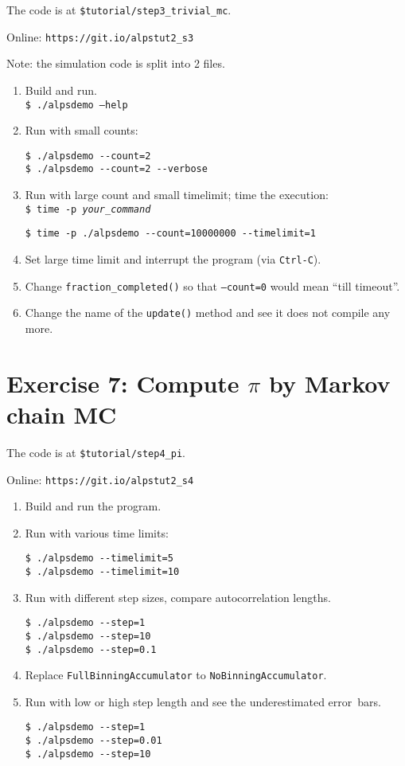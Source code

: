 \documentclass[12pt]{article}
\newcommand{\code}[1]{\texttt{#1}}
\begin{document}
The code is at \texttt{\color{ballblue}\$tutorial/step3\_trivial\_mc}.

Online: \nolinkurl{https://git.io/alpstut2_s3}

Note: the simulation code is split into 2 files.

\begin{enumerate}
\item Build and run.\\
\code{\$ ./alpsdemo --help}
\item Run with small counts:
\begin{lstlisting}[]
$ ./alpsdemo --count=2
$ ./alpsdemo --count=2 --verbose
\end{lstlisting}
\item Run with large count and small timelimit; time the execution:\\
\code{\$ time -p \emph{your\_command}}
\begin{lstlisting}[emph={time}]
$ time -p ./alpsdemo --count=10000000 --timelimit=1
\end{lstlisting}%
\item Set large time limit and interrupt the program (via \code{Ctrl-C}).
\item Change \code{fraction\_completed()} so that \code{--count=0} would mean ``till timeout''.
\item Change the name of the \code{update()} method and see it does not compile any more.
\end{enumerate}

\section{Exercise 7: Compute $\pi$ by Markov chain MC}

The code is at \texttt{\color{ballblue}\$tutorial/step4\_pi}.

Online: \nolinkurl{https://git.io/alpstut2_s4}

\begin{enumerate}
\item Build and run the program.
\item Run with various time limits:
  \begin{lstlisting}
$ ./alpsdemo --timelimit=5
$ ./alpsdemo --timelimit=10
  \end{lstlisting}
\item Run with different step sizes, compare autocorrelation lengths.
  \begin{lstlisting}
$ ./alpsdemo --step=1 
$ ./alpsdemo --step=10
$ ./alpsdemo --step=0.1
  \end{lstlisting} %
\item Replace \code{FullBinningAccumulator} to 
\code{NoBinningAccumulator}.
\item Run with low or high step length and see the underestimated error~bars.
  \begin{lstlisting}
$ ./alpsdemo --step=1
$ ./alpsdemo --step=0.01
$ ./alpsdemo --step=10
  \end{lstlisting} %
\end{enumerate}
\end{document}
